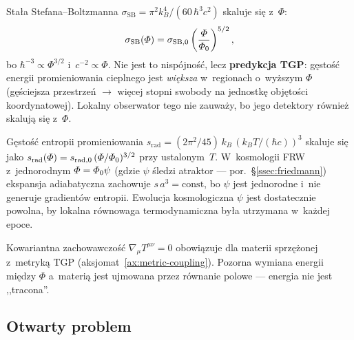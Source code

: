 \begin{remark}%
\label{rem:stefan-boltzmann}
Sta\l{}a Stefana--Boltzmanna $\sigma_{\mathrm{SB}}
= \pi^2 k_B^4 / (60\,\hbar^3 c^2)$ skaluje si\k{e} z~$\Phi$:
\begin{equation}\label{eq:sigma-SB-Phi}
  \sigma_{\mathrm{SB}}(\varPhi)
  = \sigma_{\mathrm{SB},0}
    \left(\frac{\varPhi}{\varPhi_0}\right)^{5/2},
\end{equation}
bo $\hbar^{-3} \propto \Phi^{3/2}$ i~$c^{-2} \propto \Phi$.
Nie jest to nisp\'ojno\'s\'c, lecz \textbf{predykcja TGP}:
g\k{e}sto\'s\'c energii promieniowania cieplnego jest
\emph{wi\k{e}ksza} w~regionach o~wy\.zszym $\Phi$
(g\k{e}\'sciejsza przestrze\'n $\to$ wi\k{e}cej stopni swobody
na jednostk\k{e} obj\k{e}to\'sci koordynatowej).
Lokalny obserwator tego nie zauwa\.zy, bo jego detektory
r\'ownie\.z skaluj\k{a} si\k{e} z~$\Phi$.
\end{remark}

\begin{remark}%
\label{rem:entropy-conservation}
G\k{e}sto\'s\'c entropii promieniowania $s_{\mathrm{rad}}
= (2\pi^2/45)\,k_B\,(k_B T/(\hbar c))^3$ skaluje si\k{e} jako
$s_{\mathrm{rad}}(\varPhi) = s_{\mathrm{rad},0}\,(\varPhi/\varPhi_0)^{3/2}$
przy ustalonym~$T$. W~kosmologii FRW z~jednorodnym $\varPhi = \varPhi_0\psi$
(gdzie $\psi$ \'sledzi atraktor --- por.~\S\ref{ssec:friedmann})
ekspansja adiabatyczna zachowuje $s\,a^3 = \mathrm{const}$,
bo $\psi$ jest jednorodne i~nie generuje gradient\'ow entropii.
Ewolucja kosmologiczna $\psi$ jest dostatecznie powolna,
by lokalna r\'ownowaga termodynamiczna by\l{}a utrzymana w~ka\.zdej epoce.

Kowariantna zachowawczo\'s\'c $\nabla_\mu T^{\mu\nu} = 0$
obowi\k{a}zuje dla materii sprz\k{e}\.zonej z~metryk\k{a} TGP
(aksjomat~\ref{ax:metric-coupling}). Pozorna wymiana energii
mi\k{e}dzy $\Phi$ a~materi\k{a} jest ujmowana przez r\'ownanie
polowe --- energia nie jest ,,tracona''.
\end{remark}

\subsection{Otwarty problem}\label{ssec:stale-problem}


